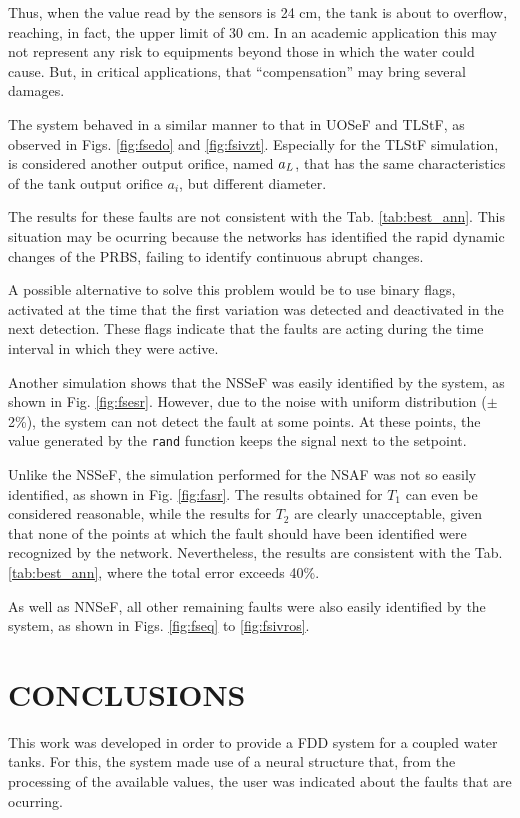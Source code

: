 \documentclass[10pt,fleqn,a4paper]{article}
\begin{document}
Thus, when the value read by the sensors is 24 cm, the tank is about to
overflow, reaching, in fact, the upper limit of 30 cm. In an academic
application this may not represent any risk to equipments beyond those in which
the water could cause. But, in critical applications, that ``compensation''
may bring several damages.

The system behaved in a similar manner to that in UOSeF and TLStF, as observed
in Figs. \ref{fig:fsedo} and \ref{fig:fsivzt}. Especially for the TLStF
simulation, is considered another output orifice, named $a_{\tiny L}$, that has
the same characteristics of the tank output orifice $a_i$, but different
diameter.

The results for these faults are not consistent with the Tab.
\ref{tab:best_ann}. This situation may be ocurring because the networks has
identified the rapid dynamic changes of the PRBS, failing to identify continuous
abrupt changes.

A possible alternative to solve this problem would be to use binary flags,
activated at the time that the first variation was detected and deactivated in
the next detection. These flags indicate that the faults are acting during the
time interval in which they were active.

Another simulation shows that the NSSeF was easily identified by the system, as
shown in Fig. \ref{fig:fsesr}. However, due to the noise with uniform
distribution ($\pm$2\%), the system can not detect the fault at some points. At
these points, the value generated by the {\tt rand} function keeps the signal
next to the setpoint.

Unlike the NSSeF, the simulation performed for the NSAF was not so easily
identified, as shown in Fig. \ref{fig:fasr}. The results obtained for $T_1$ can
even be considered reasonable, while the results for $T_2$ are clearly
unacceptable, given that none of the points at which the fault should have been
identified were recognized by the network. Nevertheless, the results are
consistent with the Tab. \ref{tab:best_ann}, where the total error exceeds 40\%.

As well as NNSeF, all other remaining faults were also easily identified by the
system, as shown in Figs. \ref{fig:fseq} to \ref{fig:fsivros}.

\section{CONCLUSIONS}\label{sec:conclusions}
This work was developed in order to provide a FDD system for a coupled water
tanks. For this, the system made use of a neural structure that, from the
processing of the available values, the user was indicated about the faults that
are ocurring.
\end{document}
